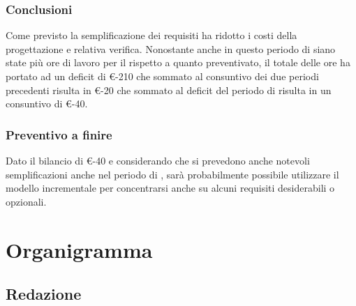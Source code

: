 \documentclass[12pt,a4paper]{article}
\begin{document}
\subsubsection{Conclusioni}
Come previsto la semplificazione dei requisiti ha ridotto i costi della progettazione e relativa verifica. Nonostante anche in questo periodo di siano state più ore di lavoro per il \RE{} rispetto a quanto preventivato, il totale delle ore ha portato ad un deficit di \euro{}-210 che sommato al consuntivo dei due periodi precedenti risulta in \euro{}-20 che sommato al deficit del periodo di \FA{} risulta in un consuntivo di \euro{}-40.

\subsubsection{Preventivo a finire}
Dato il bilancio di \euro{}-40 e considerando che si prevedono anche notevoli semplificazioni anche nel periodo di \FC{}, sarà probabilmente possibile utilizzare il modello incrementale per concentrarsi anche su alcuni requisiti desiderabili o opzionali.

\newpage

\appendix
\section{Organigramma}

\subsection{Redazione}
\end{document}
